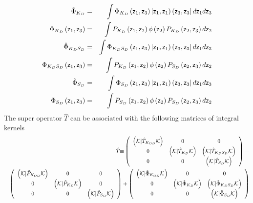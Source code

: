 \begin{eqnarray}
\hat{\Phi}_{K_{D}} &=&\int \Phi _{K_{D}}\left( {\sf z}_{1},{\sf z}%
_{3}\right) |{\sf z}_{1},{\sf z}_{1}{\bf )}\left( {\sf z}_{3},{\sf z}%
_{3}\right| d{\sf z}_{1}d{\sf z}_{3}  \nonumber \\
\Phi _{K_{D}}\left( {\sf z}_{1},{\sf z}_{3}\right) &=&\int P_{K_{D}}\left( 
{\sf z}_{1},{\sf z}_{2}\right) \phi \left( {\sf z}_{2}\right)
P_{K_{D}}\left( {\sf z}_{2},{\sf z}_{3}\right) d{\sf z}_{2}  \nonumber \\
\hat{\Phi}_{K_{D}S_{D}} &=&\int \Phi _{K_{D}S_{D}}\left( {\sf z}_{1},{\sf z}%
_{3}\right) |{\sf z}_{1},{\sf z}_{1}{\bf )}\left( {\sf z}_{3},{\sf z}%
_{3}\right| d{\sf z}_{1}d{\sf z}_{3}  \nonumber \\
\Phi _{K_{D}S_{D}}\left( {\sf z}_{1},{\sf z}_{3}\right) &=&\int
P_{K_{D}}\left( {\sf z}_{1},{\sf z}_{2}\right) \phi \left( {\sf z}%
_{2}\right) P_{S_{D}}\left( {\sf z}_{2},{\sf z}_{3}\right) d{\sf z}_{2} 
\nonumber \\
\hat{\Phi}_{S_{D}} &=&\int \Phi _{S_{D}}\left( {\sf z}_{1},{\sf z}%
_{3}\right) |{\sf z}_{1},{\sf z}_{1}{\bf )}\left( {\sf z}_{3},{\sf z}%
_{3}\right| d{\sf z}_{1}d{\sf z}_{3}  \nonumber \\
\Phi _{S_{D}}\left( {\sf z}_{1},{\sf z}_{3}\right) &=&\int P_{S_{D}}\left( 
{\sf z}_{1},{\sf z}_{2}\right) \phi \left( {\sf z}_{2}\right)
P_{S_{D}}\left( {\sf z}_{2},{\sf z}_{3}\right) d{\sf z}_{2}  \label{kerproj}
\end{eqnarray}%
The super operator $\hat{T}$ can be associated with the following matrices
of integral kernels 
\begin{eqnarray}
&&\hat{T}{\frak \equiv }\left( 
\begin{array}{ccc}
\left( {\cal K}|\hat{T}_{K_{OD}}{\cal K}\right) & 0 & 0 \\ 
0 & \left( {\cal K}|\hat{T}_{K_{D}}{\cal K}\right) & \left( {\cal K}|\hat{T}%
_{K_{D}S_{D}}{\cal K}\right) \\ 
0 & 0 & \left( {\cal K}|\hat{T}_{S_{D}}{\cal K}\right)%
\end{array}%
\right) =  \nonumber \\
&&\left( 
\begin{array}{ccc}
\left( {\cal K}|\hat{P}_{K_{OD}}{\cal K}\right) & 0 & 0 \\ 
0 & \left( {\cal K}|\hat{P}_{K_{D}}{\cal K}\right) & 0 \\ 
0 & 0 & \left( {\cal K}|\hat{P}_{S_{D}}{\cal K}\right)%
\end{array}%
\right) +\left( 
\begin{array}{ccc}
\left( {\cal K}|\hat{\Phi}_{K_{OD}}{\cal K}\right) & 0 & 0 \\ 
0 & \left( {\cal K}|\hat{\Phi}_{K_{D}}{\cal K}\right) & \left( {\cal K}|\hat{%
\Phi}_{K_{D}S_{D}}{\cal K}\right) \\ 
0 & 0 & \left( {\cal K}|\hat{\Phi}_{S_{D}}{\cal K}\right)%
\end{array}%
\right)  \nonumber \\
&&
\end{eqnarray}%
